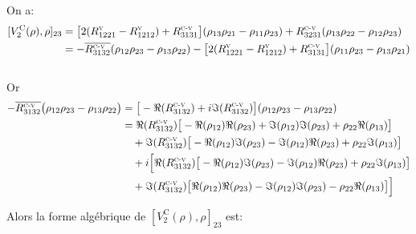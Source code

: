\documentclass[12pt,a4paper,openany,oneside]{book}
\begin{document}
{{{{{{On a:
\begin{eqnarray*}
\begin{split}
[V_{2}^{\textrm{C}}(\rho),\rho]_{23} &= \big[2(R^{\textsc{v}}_{1221}-R^{\textsc{v}}_{1212})+ R^{\textsc{c-v}}_{3131}\big]( \rho_{13}\rho_{21} - \rho_{11}\rho_{23}) + R^{\textsc{c-v}}_{3231}( \rho_{13}\rho_{22} - \rho_{12}\rho_{23})\\
&= -\overline{R^{\textsc{c-v}}_{3132}}( \rho_{12}\rho_{23} - \rho_{13}\rho_{22})- \big[2(R^{\textsc{v}}_{1221}-R^{\textsc{v}}_{1212})+R^{\textsc{c-v}}_{3131}\big]( \rho_{11}\rho_{23} - \rho_{13}\rho_{21})
\end{split}                         
\end{eqnarray*}\\

Or 
\begin{eqnarray*}
\begin{split}
-\overline{R^{\textsc{c-v}}_{3132}}\big(\rho_{12}\rho_{23} - \rho_{13}\rho_{22}\big) &= \big[-\Re(R^{\textsc{c-v}}_{3132})+i\Im(R^{\textsc{c-v}}_{3132})\big](\rho_{12}\rho_{23} - \rho_{13}\rho_{22})\\
&= \Re(R^{\textsc{c-v}}_{3132})\big[-\Re(\rho_{12})\Re(\rho_{23})+\Im(\rho_{12})\Im(\rho_{23})+\rho_{22}\Re(\rho_{13})\big]\\
&\quad +\Im(R^{\textsc{c-v}}_{3132})\big[-\Re(\rho_{12})\Im(\rho_{23})-\Im(\rho_{12})\Re(\rho_{23})+\rho_{22}\Im(\rho_{13})\big]\\
&\quad +i\Big[\Re(R^{\textsc{c-v}}_{3132})\big[-\Re(\rho_{12})\Im(\rho_{23})-\Im(\rho_{12})\Re(\rho_{23})+\rho_{22}\Im(\rho_{13})\big]\\
&\quad +\Im(R^{\textsc{c-v}}_{3132})\big[\Re(\rho_{12})\Re(\rho_{23})-\Im(\rho_{12})\Im(\rho_{23})-\rho_{22}\Re(\rho_{13})\big]\Big]
\end{split}
\end{eqnarray*}

Alors la forme algébrique de $ [V_{2}^{\textrm{C}}(\rho),\rho]_{23}$ est:

}}}}}}
\end{document}
